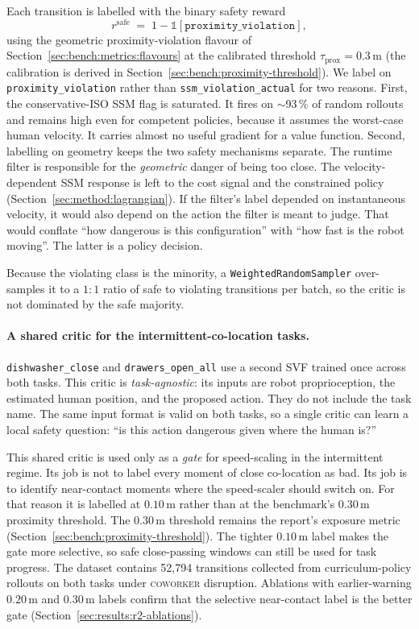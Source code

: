 \documentclass[11pt,a4paper]{report}
\newcommand{\ssm}{SSM}
\newcommand{\coworker}{\textsc{coworker}}
\begin{document}
Each transition is labelled with the binary safety reward
\begin{equation}
  r^{\mathrm{safe}} \;=\; 1 - \mathbb{1}[\texttt{proximity\_violation}],
  \label{eq:r-safe}
\end{equation}
using the geometric proximity-violation flavour of
Section~\ref{sec:bench:metrics:flavours} at the calibrated threshold
$\tau_{\mathrm{prox}} = 0.3$\,m (the calibration is derived in
Section~\ref{sec:bench:proximity-threshold}). We label on
\texttt{proximity\_violation} rather than
\texttt{ssm\_violation\_actual} for two reasons. First, the
conservative-ISO \ssm{} flag is saturated. It fires on $\sim$93\,\% of
random rollouts and remains high even for competent policies, because
it assumes the worst-case human velocity. It carries almost no useful
gradient for a value function. Second, labelling on geometry keeps the
two safety mechanisms separate. The runtime filter is responsible for
the \emph{geometric} danger of being too close. The velocity-dependent
\ssm{} response is left to the cost signal and the constrained policy
(Section~\ref{sec:method:lagrangian}). If the filter's label depended
on instantaneous velocity, it would also depend on the action the
filter is meant to judge. That would conflate ``how dangerous is this
configuration'' with ``how fast is the robot moving''. The latter is a
policy decision.

Because the violating class is the minority, a
\texttt{WeightedRandomSampler} over-samples it to a $1{:}1$ ratio of
safe to violating transitions per batch, so the critic is not
dominated by the safe majority.

\paragraph{A shared critic for the intermittent-co-location tasks.}
\texttt{dishwasher\_close} and \texttt{drawers\_open\_all} use a
second SVF trained once across both tasks. This critic is
\emph{task-agnostic}: its inputs are robot proprioception, the
estimated human position, and the proposed action. They do not include
the task name. The same input format is valid on both tasks, so a
single critic can learn a local safety question: ``is this action
dangerous given where the human is?''

This shared critic is used only as a \emph{gate} for speed-scaling in
the intermittent regime. Its job is not to label every moment of close
co-location as bad. Its job is to identify near-contact moments where
the speed-scaler should switch on. For that reason it is labelled at
$0.10$\,m rather than at the benchmark's $0.30$\,m proximity threshold.
The $0.30$\,m threshold remains the report's exposure metric
(Section~\ref{sec:bench:proximity-threshold}). The tighter $0.10$\,m
label makes the gate more selective, so safe close-passing windows can
still be used for task progress. The dataset contains 52{,}794
transitions collected from curriculum-policy rollouts on both tasks
under \coworker{} disruption. Ablations with earlier-warning
$0.20$\,m and $0.30$\,m labels confirm that the selective near-contact
label is the better gate (Section~\ref{sec:results:r2-ablations}).
\end{document}
